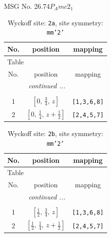 \documentclass[fleqn,8pt]{jsarticle}
\begin{document}
\setcounter{MaxMatrixCols}{32}

\renewcommand{\tablename}{Table~}
\renewcommand{\figurename}{Figure~}
\begin{center}
\LARGE
MSG No. 26.74\quad$P_{A}mc2_{1}$
\end{center}
\renewcommand{\arraystretch}{1.2}
\begin{longtable}{ccc}
\caption{Wyckoff site: {\tt 2a}, site symmetry: {\tt mm'2'}}
 \\
 \hline \hline
No. & position & mapping \\ \hline \endfirsthead

\multicolumn{2}{l}{\tablename\ \thetable{}} \\
 \hline \hline
No. & position & mapping \\ \hline \endhead

 \hline \hline
\multicolumn{2}{r}{\footnotesize\it continued ...} \\ \endfoot

 \hline \hline
\multicolumn{2}{r}{} \\ \endlastfoot

1 & $\left[ 0,\, \frac{3}{4},\, z \right]$ & {\tt [1,3,6,8]} \\ \hline
2 & $\left[ 0,\, \frac{1}{4},\, z + \frac{1}{2} \right]$ & {\tt [2,4,5,7]} \\
\end{longtable}
\renewcommand{\arraystretch}{1.2}
\begin{longtable}{ccc}
\caption{Wyckoff site: {\tt 2b}, site symmetry: {\tt mm'2'}}
 \\
 \hline \hline
No. & position & mapping \\ \hline \endfirsthead

\multicolumn{2}{l}{\tablename\ \thetable{}} \\
 \hline \hline
No. & position & mapping \\ \hline \endhead

 \hline \hline
\multicolumn{2}{r}{\footnotesize\it continued ...} \\ \endfoot

 \hline \hline
\multicolumn{2}{r}{} \\ \endlastfoot

1 & $\left[ \frac{1}{2},\, \frac{3}{4},\, z \right]$ & {\tt [1,3,6,8]} \\ \hline
2 & $\left[ \frac{1}{2},\, \frac{1}{4},\, z + \frac{1}{2} \right]$ & {\tt [2,4,5,7]} \\
\end{longtable}
\end{document}
